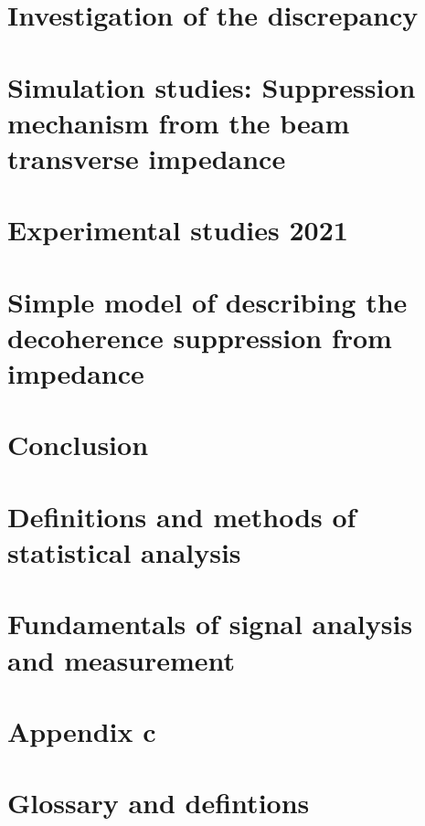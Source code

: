 \documentclass[12pt,twoside]{report} %
\begin{document}
%

\chapter{Investigation of the discrepancy}\label{Ch:investigating_discrepancy}


\chapter{Simulation studies: Suppression mechanism from the beam transverse impedance}\label{Ch:suppression_impedances}\label{Ch:suppression_impedance}


\chapter{Experimental studies 2021}


\chapter{Simple model of describing the decoherence suppression from impedance}







\chapter{Conclusion}


\printglossaries
\appendix
\chapter{Definitions and  methods of statistical analysis}

\chapter{Fundamentals of signal analysis and measurement}\label{ch:app_B}

\chapter{Appendix c}\label{ch:app_B}

\chapter{Glossary and defintions}


\backmatter
\printbibliography
{}
\end{document}
